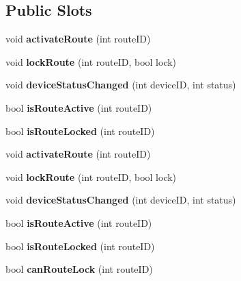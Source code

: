 \subsection*{Public Slots}
\begin{DoxyCompactItemize}
\item 
\mbox{\label{class_route_handler_a0e887e045860b5ae73a6f080e7fb483a}} 
void {\bfseries activate\+Route} (int route\+ID)
\item 
\mbox{\label{class_route_handler_a3414562e872fa261076663fb55f102d4}} 
void {\bfseries lock\+Route} (int route\+ID, bool lock)
\item 
\mbox{\label{class_route_handler_a56be26fab73e025b165cbe3c8a806ffb}} 
void {\bfseries device\+Status\+Changed} (int device\+ID, int status)
\item 
\mbox{\label{class_route_handler_a8ac449cce11b30b2d4d310af84b70828}} 
bool {\bfseries is\+Route\+Active} (int route\+ID)
\item 
\mbox{\label{class_route_handler_a7ebd0398bdc7dfcf3b5e865f3d1c28f5}} 
bool {\bfseries is\+Route\+Locked} (int route\+ID)
\item 
\mbox{\label{class_route_handler_a0e887e045860b5ae73a6f080e7fb483a}} 
void {\bfseries activate\+Route} (int route\+ID)
\item 
\mbox{\label{class_route_handler_a3414562e872fa261076663fb55f102d4}} 
void {\bfseries lock\+Route} (int route\+ID, bool lock)
\item 
\mbox{\label{class_route_handler_a56be26fab73e025b165cbe3c8a806ffb}} 
void {\bfseries device\+Status\+Changed} (int device\+ID, int status)
\item 
\mbox{\label{class_route_handler_a8ac449cce11b30b2d4d310af84b70828}} 
bool {\bfseries is\+Route\+Active} (int route\+ID)
\item 
\mbox{\label{class_route_handler_a7ebd0398bdc7dfcf3b5e865f3d1c28f5}} 
bool {\bfseries is\+Route\+Locked} (int route\+ID)
\item 
\mbox{\label{class_route_handler_a094b5f9fee8f5cfcd1a742e89d1d2b3d}} 
bool {\bfseries can\+Route\+Lock} (int route\+ID)
\end{DoxyCompactItemize}
